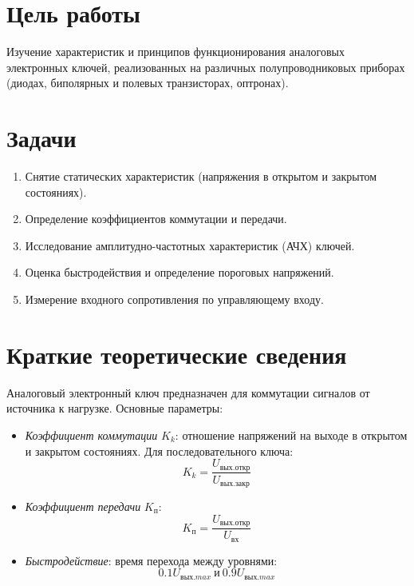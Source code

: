 \section*{Цель работы}
Изучение характеристик и принципов функционирования аналоговых электронных ключей, реализованных на различных полупроводниковых приборах (диодах, биполярных и полевых транзисторах, оптронах).

\section*{Задачи}
\begin{enumerate}
    \item Снятие статических характеристик (напряжения в открытом и закрытом состояниях).
    \item Определение коэффициентов коммутации и передачи.
    \item Исследование амплитудно-частотных характеристик (АЧХ) ключей.
    \item Оценка быстродействия и определение пороговых напряжений.
    \item Измерение входного сопротивления по управляющему входу.
\end{enumerate}

\section*{Краткие теоретические сведения}
Аналоговый электронный ключ предназначен для коммутации сигналов от источника к нагрузке. Основные параметры:
\begin{itemize}
    \item \textit{Коэффициент коммутации} $K_k$: отношение напряжений на выходе в открытом и закрытом состояниях. Для последовательного ключа:
    \begin{equation*}
        K_k = \frac{U_{вых.откр}}{U_{вых.закр}}
    \end{equation*}
    \item \textit{Коэффициент передачи} $K_п$:
    \begin{equation*}
        K_п = \frac{U_{вых.откр}}{U_{вх}}
    \end{equation*}
    \item \textit{Быстродействие}: время перехода между уровнями:
    \begin{equation*}
        0.1 U_{вых.max}~и~0.9 U_{вых.max}
    \end{equation*}
\end{itemize}

